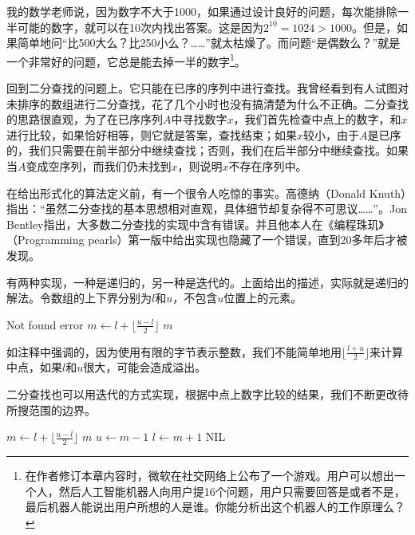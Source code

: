 \documentclass[UTF8]{article}
\begin{document}
我的数学老师说，因为数字不大于1000，如果通过设计良好的问题，每次能排除一半可能的数字，就可以在10次内找出答案。这是因为$2^{10} = 1024 > 1000$。但是，如果简单地问“比500大么？比250小么？……”就太枯燥了。而问题“是偶数么？”就是一个非常好的问题，它总是能去掉一半的数字\footnote{在作者修订本章内容时，微软在社交网络上公布了一个游戏。用户可以想出一个人，然后人工智能机器人向用户提16个问题，用户只需要回答是或者不是，最后机器人能说出用户所想的人是谁。你能分析出这个机器人的工作原理么？}。

回到二分查找的问题上。它只能在已序的序列中进行查找。我曾经看到有人试图对未排序的数组进行二分查找，花了几个小时也没有搞清楚为什么不正确。二分查找的思路很直观，为了在已序序列$A$中寻找数字$x$，我们首先检查中点上的数字，和$x$进行比较，如果恰好相等，则它就是答案，查找结束；如果$x$较小，由于$A$是已序的，我们只需要在前半部分中继续查找；否则，我们在后半部分中继续查找。如果当$A$变成空序列，而我们仍未找到$x$，则说明$x$不存在序列中。

在给出形式化的算法定义前，有一个很令人吃惊的事实。高德纳（Donald Knuth）指出：“虽然二分查找的基本思想相对直观，具体细节却复杂得不可思议……”。Jon Bentley指出，大多数二分查找的实现中含有错误。并且他本人在《编程珠玑》（Programming pearls）第一版中给出实现也隐藏了一个错误，直到20多年后才被发现\cite{programming-pearls}。

有两种实现，一种是递归的，另一种是迭代的。上面给出的描述，实际就是递归的解法。令数组的上下界分别为$l$和$u$，不包含$u$位置上的元素。

\begin{algorithmic}[1]
    \State Not found error
  \Else
     \State $m \gets l + \lfloor \frac{u - l}{2} \rfloor$ 
       \State \Return $m$
     \EndIf
       \State \Return {}
     \Else
       \State \Return {}
     \EndIf
  \EndIf
\EndFunction
\end{algorithmic}

如注释中强调的，因为使用有限的字节表示整数，我们不能简单地用$\lfloor \frac{l+u}{2} \rfloor$来计算中点，如果$l$和$u$很大，可能会造成溢出。

二分查找也可以用迭代的方式实现，根据中点上数字比较的结果，我们不断更改待所搜范围的边界。

\begin{algorithmic}[1]
    \State $m \gets l + \lfloor \frac{u - l}{2} \rfloor$
      \State \Return $m$
    \EndIf
      \State $u \gets m - 1$
    \Else
      \State $l \gets m + 1$
    \EndIf
  \EndWhile
  \Return NIL
\EndFunction
\end{algorithmic}
\end{document}

